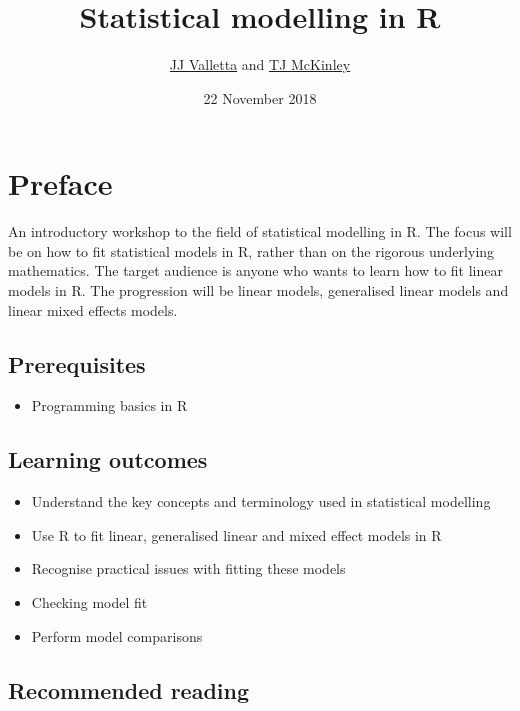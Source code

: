 \documentclass[]{book}
\title{Statistical modelling in R}
\author{\href{mailto:jj.valletta@exeter.ac.uk}{JJ Valletta} and
\href{mailto:T.McKinley@exeter.ac.uk}{TJ McKinley}}
\date{22 November 2018}
\providecommand{\tightlist}{%
  \setlength{\itemsep}{0pt}\setlength{\parskip}{0pt}}
\theoremstyle{definition}
\theoremstyle{definition}
\theoremstyle{definition}
\theoremstyle{remark}
\begin{document}
\maketitle

{
\hypersetup{linkcolor=black}
\setcounter{tocdepth}{1}
\tableofcontents
}
\chapter*{Preface}\label{preface}

An introductory workshop to the field of statistical modelling in R. The
focus will be on how to fit statistical models in R, rather than on the
rigorous underlying mathematics. The target audience is anyone who wants
to learn how to fit linear models in R. The progression will be linear
models, generalised linear models and linear mixed effects models.

\section*{Prerequisites}\label{prerequisites}

\begin{itemize}
\tightlist
\item
  Programming basics in R
\end{itemize}

\section*{Learning outcomes}\label{learning-outcomes}

\begin{itemize}
\tightlist
\item
  Understand the key concepts and terminology used in statistical
  modelling
\item
  Use R to fit linear, generalised linear and mixed effect models in R
\item
  Recognise practical issues with fitting these models
\item
  Checking model fit
\item
  Perform model comparisons
\end{itemize}

\section*{Recommended reading}\label{recommended-reading}
\end{document}
